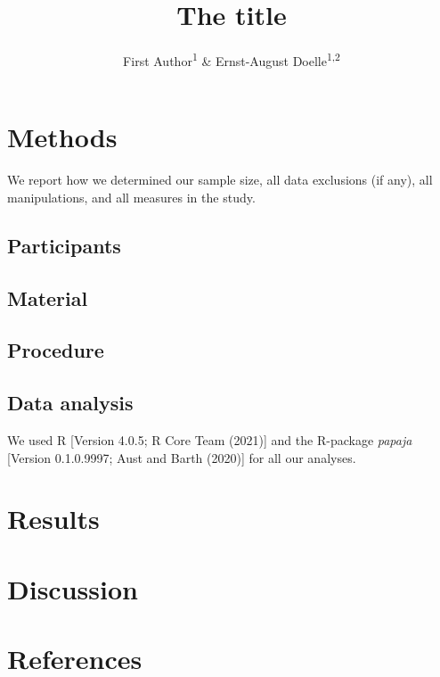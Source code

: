 \documentclass[
  english,
  man]{apa6}
\title{The title}
\author{First Author\textsuperscript{1} \& Ernst-August Doelle\textsuperscript{1,2}}
\date{}
\affiliation{\vspace{0.5cm}\textsuperscript{1} Wilhelm-Wundt-University\\\textsuperscript{2} Konstanz Business School}
\begin{document}
\maketitle

\hypertarget{methods}{%
\section{Methods}\label{methods}}

We report how we determined our sample size, all data exclusions (if any), all manipulations, and all measures in the study.

\hypertarget{participants}{%
\subsection{Participants}\label{participants}}

\hypertarget{material}{%
\subsection{Material}\label{material}}

\hypertarget{procedure}{%
\subsection{Procedure}\label{procedure}}

\hypertarget{data-analysis}{%
\subsection{Data analysis}\label{data-analysis}}

We used R {[}Version 4.0.5; R Core Team (2021){]} and the R-package \emph{papaja} {[}Version 0.1.0.9997; Aust and Barth (2020){]} for all our analyses.

\hypertarget{results}{%
\section{Results}\label{results}}

\hypertarget{discussion}{%
\section{Discussion}\label{discussion}}

\newpage

\hypertarget{references}{%
\section{References}\label{references}}
\end{document}
